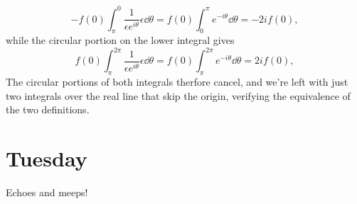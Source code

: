 \documentclass[12pt]{article}
\newcommand{\cint}[2]{\int_{#1}^{#2}}
\begin{document}
\[ -f(0)\cint{\pi}{0}\frac{1}{\epsilon e^{i\theta}}\epsilon \dd\theta = f(0)\cint{0}{\pi}e^{-i\theta}\dd\theta = -2if(0), \]
while the circular portion on the lower integral gives
\[ f(0)\cint{\pi}{2\pi}\frac{1}{\epsilon e^{i\theta}}\epsilon \dd\theta = f(0)\cint{\pi}{2\pi}e^{-i\theta}\dd\theta = 2if(0), \]
The circular portions of both integrals therfore cancel, and we're left with just two integrals over the real line that skip the origin, verifying the equivalence of the two definitions. 

\section*{Tuesday}
Echoes and meeps!
\end{document}
